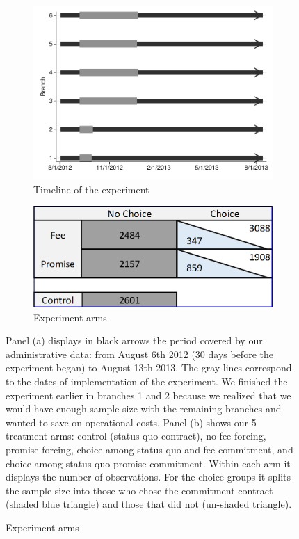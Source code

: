 \documentclass[oneside,11pt]{article}
\begin{document}
\begin{figure}[H]
     \caption{Experiment description}
    \label{exp_description}
    \begin{center}
    \begin{subfigure}{.40\textwidth}
      \caption{Timeline of the experiment}
        \centering
        \includegraphics[width=\textwidth]{Figuras/timeline_suc_exp_extended.pdf}
    \end{subfigure}
    \begin{subfigure}{0.40\textwidth}
    \caption{Experiment arms}
       \centering
      \includegraphics[width=\textwidth]{Figuras/exp_arms.PNG}
    \end{subfigure}
    \end{center}
         \scriptsize Panel (a) displays in black arrows the period covered by our administrative data: from August 6th 2012 (30 days before the experiment began) to August 13th 2013. The gray lines correspond to the dates of implementation of the experiment. We finished the experiment earlier in branches 1 and 2 because we realized that we would have enough sample size with the remaining branches and wanted to save on operational costs. Panel (b) shows our 5 treatment arms: control (status quo contract), no fee-forcing, promise-forcing, choice among status quo and fee-commitment, and choice among status quo promise-commitment. Within each arm it displays the number of observations. For the choice groups it splits the sample size into those who chose the commitment contract (shaded blue triangle) and those that did not (un-shaded triangle).
\end{figure}
\end{document}

